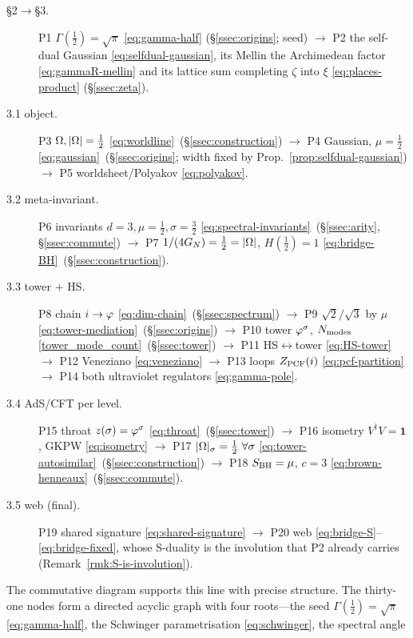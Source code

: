 \begin{description}
  \item[\S2$\to$\S3.] P1 $\Gamma(\tfrac12)=\sqrt\pi$ \eqref{eq:gamma-half} (\S\ref{ssec:origins}; seed)
        $\to$ P2 the self-dual Gaussian \eqref{eq:selfdual-gaussian}, its Mellin the Archimedean
        factor \eqref{eq:gammaR-mellin} and its lattice sum completing $\zeta$ into
        $\xi$ \eqref{eq:places-product} (\S\ref{ssec:zeta}).
  \item[3.1 object.] P3 $\Omega,|\Omega|=\tfrac12$ \eqref{eq:worldline}~(\S\ref{ssec:construction}) $\to$ P4 Gaussian, $\mu=\tfrac12$
        \eqref{eq:gaussian}~(\S\ref{ssec:origins}; width fixed by Prop.~\ref{prop:selfdual-gaussian}) $\to$ P5 worldsheet/Polyakov \eqref{eq:polyakov}.
  \item[3.2 meta-invariant.] P6 invariants $d{=}3,\mu{=}\tfrac12,\sigma{=}\tfrac32$
        \eqref{eq:spectral-invariants}~(\S\ref{ssec:arity},\,\S\ref{ssec:commute}) $\to$ P7 $1/(4G_{N})=\tfrac12=|\Omega|$, $H(\tfrac12)=1$
        \eqref{eq:bridge-BH}~(\S\ref{ssec:construction}).
  \item[3.3 tower $+$ HS.] P8 chain $i\to\varphi$ \eqref{eq:dim-chain}~(\S\ref{ssec:spectrum}) $\to$ P9 $\sqrt2/\sqrt3$ by $\mu$
        \eqref{eq:tower-mediation}~(\S\ref{ssec:origins}) $\to$ P10 tower $\varphi^{\sigma}$, $N_{\mathrm{modes}}$ \eqref{tower_mode_count}~(\S\ref{ssec:tower})
        $\to$ P11 HS$\leftrightarrow$tower \eqref{eq:HS-tower} $\to$ P12 Veneziano \eqref{eq:veneziano}
        $\to$ P13 loops $Z_{\mathrm{PCF}}(i)$ \eqref{eq:pcf-partition} $\to$ P14 both ultraviolet regulators \eqref{eq:gamma-pole}.
  \item[3.4 AdS/CFT per level.] P15 throat $z(\sigma)=\varphi^{\sigma}$ \eqref{eq:throat}~(\S\ref{ssec:tower}) $\to$ P16
        isometry $V^{\dagger}V=\mathbf 1$, GKPW \eqref{eq:isometry} $\to$ P17 $|\Om|_{\sigma}=\tfrac12\ \forall\sigma$
        \eqref{eq:tower-autosimilar}~(\S\ref{ssec:construction}) $\to$ P18 $S_{\mathrm{BH}}=\mu$, $c=3$ \eqref{eq:brown-henneaux}~(\S\ref{ssec:commute}).
  \item[3.5 web (final).] P19 shared signature \eqref{eq:shared-signature} $\to$ P20 web
        \eqref{eq:bridge-S}--\eqref{eq:bridge-fixed}, whose S-duality is the involution that
        P2 already carries (Remark~\ref{rmk:S-is-involution}).
\end{description}
\noindent The commutative diagram supports this line with precise structure. The thirty-one
nodes form a directed acyclic graph with four roots---the seed $\Gamma(\tfrac12)=\sqrt\pi$
\eqref{eq:gamma-half}, the Schwinger parametrisation \eqref{eq:schwinger}, the spectral angle
